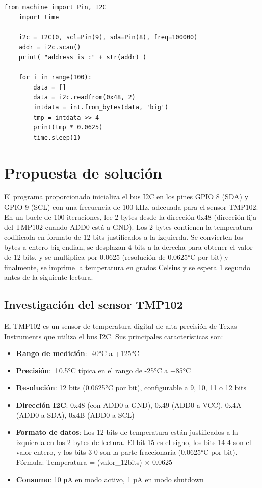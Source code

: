 \documentclass[letterpaper,12pt]{article}
\begin{document}
    \begin{lstlisting}[basicstyle=\ttfamily\footnotesize,caption={Figura 10-14. C\'odigo de ejemplo; actividad 7}]
    from machine import Pin, I2C
    import time

    i2c = I2C(0, scl=Pin(9), sda=Pin(8), freq=100000)
    addr = i2c.scan()
    print( "address is :" + str(addr) )

    for i in range(100):
        data = []
        data = i2c.readfrom(0x48, 2)
        intdata = int.from_bytes(data, 'big')
        tmp = intdata >> 4
        print(tmp * 0.0625)
        time.sleep(1)
    \end{lstlisting}

    \section*{Propuesta de soluci\'on}

    El programa proporcionado inicializa el bus I2C en los pines GPIO 8 (SDA) y GPIO 9 (SCL) con una frecuencia de 100 kHz, adecuada para el sensor TMP102. En un bucle de 100 iteraciones, lee 2 bytes desde la direcci\'on 0x48 (direcci\'on fija del TMP102 cuando ADD0 est\'a a GND). Los 2 bytes contienen la temperatura codificada en formato de 12 bits justificados a la izquierda. Se convierten los bytes a entero big-endian, se desplazan 4 bits a la derecha para obtener el valor de 12 bits, y se multiplica por 0.0625 (resoluci\'on de 0.0625°C por bit) y finalmente, se imprime la temperatura en grados Celsius y se espera 1 segundo antes de la siguiente lectura.

    \subsection*{Investigaci\'on del sensor TMP102}

    El TMP102 es un sensor de temperatura digital de alta precisi\'on de Texas Instruments que utiliza el bus I2C. Sus principales caracter\'isticas son:

    \begin{itemize}
        \item \textbf{Rango de medici\'on}: -40°C a +125°C
        \item \textbf{Precisi\'on}: ±0.5°C t\'ipica en el rango de -25°C a +85°C
        \item \textbf{Resoluci\'on}: 12 bits (0.0625°C por bit), configurable a 9, 10, 11 o 12 bits
        \item \textbf{Direcci\'on I2C}: 0x48 (con ADD0 a GND), 0x49 (ADD0 a VCC), 0x4A (ADD0 a SDA), 0x4B (ADD0 a SCL)
        \item \textbf{Formato de datos}: Los 12 bits de temperatura est\'an justificados a la izquierda en los 2 bytes de lectura. El bit 15 es el signo, los bits 14-4 son el valor entero, y los bits 3-0 son la parte fraccionaria (0.0625°C por bit). F\'ormula: Temperatura = (valor\_12bits) × 0.0625
        \item \textbf{Consumo}: 10 µA en modo activo, 1 µA en modo shutdown
    \end{itemize}
\end{document}
